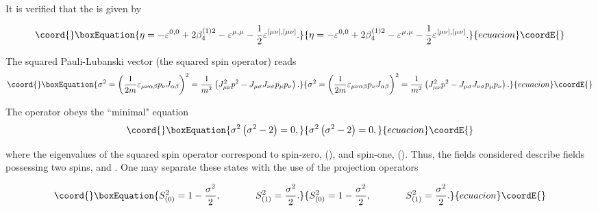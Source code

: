 \documentclass[a4paper,12pt]{article}
\begin{document}
It is verified that the \myHighlight{$\eta$}\coordHE{} is given by

\begin{equation}\coord{}\boxEquation{
\eta =-\varepsilon ^{0,0}+2\beta _4^{(1)2}-\varepsilon ^{\mu ,\mu
}-\frac 12\varepsilon ^{[\mu \nu ],[\mu \nu ]}. \label{45}
}{
\eta =-\varepsilon ^{0,0}+2\beta _4^{(1)2}-\varepsilon ^{\mu ,\mu
}-\frac 12\varepsilon ^{[\mu \nu ],[\mu \nu ]}. }{ecuacion}\coordE{}\end{equation}

The squared Pauli-Lubanski vector (the squared spin operator)
reads
\begin{equation}\coord{}\boxEquation{
\sigma ^2=\left( \frac 1{2m}\varepsilon _{\mu \nu \alpha \beta
}p_\nu J_{\alpha \beta }\right) ^2=\frac 1{m^2}\left( J_{\mu \nu
}^2p^2-J_{\mu \sigma }J_{\nu \sigma }p_\mu p_\nu \right) .
\label{46}
}{
\sigma ^2=\left( \frac 1{2m}\varepsilon _{\mu \nu \alpha \beta
}p_\nu J_{\alpha \beta }\right) ^2=\frac 1{m^2}\left( J_{\mu \nu
}^2p^2-J_{\mu \sigma }J_{\nu \sigma }p_\mu p_\nu \right) .
}{ecuacion}\coordE{}\end{equation}

The operator \coordHE{} obeys the ``minimal" equation
\begin{equation}\coord{}\boxEquation{
\sigma ^2\left( \sigma ^2-2\right) =0,  \label{47}
}{
\sigma ^2\left( \sigma ^2-2\right) =0,  }{ecuacion}\coordE{}\end{equation}

where the eigenvalues of the squared spin operator \coordHE{}
correspond to spin-zero, \coordHE{} (\coordHE{}),  and spin-one, \coordHE{}
(\coordHE{}). Thus, the fields considered describe fields
possessing two spins, \coordHE{} and \coordHE{}. One may separate these
states with the use of the projection operators

\begin{equation}\coord{}\boxEquation{
S_{(0)}^2=1-\frac{\sigma ^2}2,\hspace{0.5in}S_{(1)}^2=\frac{\sigma
^2}2. \label{48}
}{
S_{(0)}^2=1-\frac{\sigma ^2}2,\hspace{0.5in}S_{(1)}^2=\frac{\sigma
^2}2. }{ecuacion}\coordE{}\end{equation}
\end{document}
